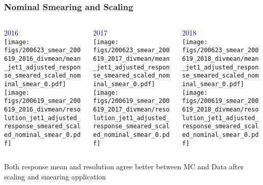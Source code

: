 \documentclass{beamer}
\begin{document}
\begin{frame}
  \frametitle{Nominal Smearing and Scaling}

  \begin{columns}
    \begin{column}{0.33\linewidth}
      \centering
      \textcolor{blue}{2016} \\
      \texttt{[image: figs/200623\_smear\_200619\_2016\_divmean/mean\_jet1\_adjusted\_response\_smeared\_scaled\_nominal\_smear\_0.pdf]} \\
      \texttt{[image: figs/200619\_smear\_200619\_2016\_divmean/resolution\_jet1\_adjusted\_response\_smeared\_scaled\_nominal\_smear\_0.pdf]}
    \end{column}
    \begin{column}{0.34\linewidth}
      \centering
      \textcolor{blue}{2017} \\
      \texttt{[image: figs/200623\_smear\_200619\_2017\_divmean/mean\_jet1\_adjusted\_response\_smeared\_scaled\_nominal\_smear\_0.pdf]} \\
      \texttt{[image: figs/200619\_smear\_200619\_2017\_divmean/resolution\_jet1\_adjusted\_response\_smeared\_scaled\_nominal\_smear\_0.pdf]}
    \end{column}
    \begin{column}{0.33\linewidth}
      \centering
      \textcolor{blue}{2018} \\
      \texttt{[image: figs/200623\_smear\_200619\_2018\_divmean/mean\_jet1\_adjusted\_response\_smeared\_scaled\_nominal\_smear\_0.pdf]} \\
      \texttt{[image: figs/200619\_smear\_200619\_2018\_divmean/resolution\_jet1\_adjusted\_response\_smeared\_scaled\_nominal\_smear\_0.pdf]}
    \end{column}
  \end{columns}

  \vfill
  Both response mean and resolution agree better between MC and Data
  after scaling and smearing application

\end{frame}
\end{document}
